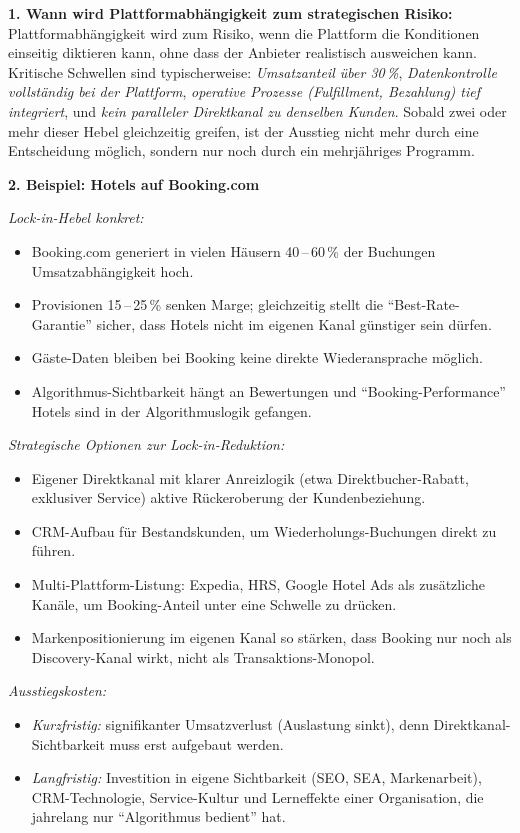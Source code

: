 \documentclass[11pt,a4paper,oneside]{article}
\begin{document}
\begin{loesungbox}
\textbf{1. Wann wird Plattformabhängigkeit zum strategischen Risiko:}
Plattformabhängigkeit wird zum Risiko, wenn die Plattform die Konditionen einseitig diktieren kann, ohne dass der Anbieter realistisch ausweichen kann. Kritische Schwellen sind typischerweise: \emph{Umsatzanteil über 30\,\%}, \emph{Datenkontrolle vollständig bei der Plattform}, \emph{operative Prozesse (Fulfillment, Bezahlung) tief integriert}, und \emph{kein paralleler Direktkanal zu denselben Kunden}. Sobald zwei oder mehr dieser Hebel gleichzeitig greifen, ist der Ausstieg nicht mehr durch eine Entscheidung möglich, sondern nur noch durch ein mehrjähriges Programm.

\smallskip
\textbf{2. Beispiel: Hotels auf Booking.com}

\smallskip
\emph{Lock-in-Hebel konkret:}
\begin{itemize}
  \item Booking.com generiert in vielen Häusern 40\,--\,60\,\% der Buchungen \textendash{} Umsatzabhängigkeit hoch.
  \item Provisionen 15\,--\,25\,\% senken Marge; gleichzeitig stellt die ``Best-Rate-Garantie'' sicher, dass Hotels nicht im eigenen Kanal günstiger sein dürfen.
  \item Gäste-Daten bleiben bei Booking \textendash{} keine direkte Wiederansprache möglich.
  \item Algorithmus-Sichtbarkeit hängt an Bewertungen und ``Booking-Performance'' \textendash{} Hotels sind in der Algorithmuslogik gefangen.
\end{itemize}

\emph{Strategische Optionen zur Lock-in-Reduktion:}
\begin{itemize}
  \item Eigener Direktkanal mit klarer Anreizlogik (etwa Direktbucher-Rabatt, exklusiver Service) \textendash{} aktive Rückeroberung der Kundenbeziehung.
  \item CRM-Aufbau für Bestandskunden, um Wiederholungs-Buchungen direkt zu führen.
  \item Multi-Plattform-Listung: Expedia, HRS, Google Hotel Ads als zusätzliche Kanäle, um Booking-Anteil unter eine Schwelle zu drücken.
  \item Markenpositionierung im eigenen Kanal so stärken, dass Booking nur noch als Discovery-Kanal wirkt, nicht als Transaktions-Monopol.
\end{itemize}

\emph{Ausstiegskosten:}
\begin{itemize}
  \item \emph{Kurzfristig:} signifikanter Umsatzverlust (Auslastung sinkt), denn Direktkanal-Sichtbarkeit muss erst aufgebaut werden.
  \item \emph{Langfristig:} Investition in eigene Sichtbarkeit (SEO, SEA, Markenarbeit), CRM-Technologie, Service-Kultur \textendash{} und Lerneffekte einer Organisation, die jahrelang nur ``Algorithmus bedient'' hat.
\end{itemize}


\end{loesungbox}
\end{document}
